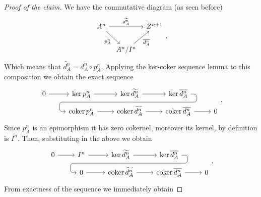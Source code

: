 \documentclass[../Main]{subfiles}
\begin{document}
\begin{proof}[Proof of the claim]
	We have the commutative diagram
	(as seen before)
	\begin{equation}
	\begin{tikzcd}[column sep=tiny]
		A^n \arrow[rr, "\widetilde{d^n_A}", rightarrow] 
		\arrow[rd, "p^n_A"', rightarrow] & &
		Z^{n+1}\\
		&
		A^n/I^n \arrow[ur, "\overline{d^n_A}"', rightarrow] 
	\end{tikzcd}
	.\end{equation} 
	Which means that $\widetilde{d^n_A} = \overline{d^n_A} \circ p^n_A$.
	Applying the ker-coker sequence lemma to this composition we obtain the exact sequence
	\begin{equation}
	\begin{tikzcd}[row sep=tiny]
		0 \arrow[r, "", rightarrow] &
		\ker p^n_A \arrow[r, "", rightarrow] &
		\ker \widetilde{d^n_A} \arrow[r, "", rightarrow] 
		\arrow[d, phantom, ""{coordinate, name=Z}] &
		\ker \overline{d^n_A} 
		\arrow[dll, "", rounded corners, bend left = 100,
		to path={ -- ([xshift=2ex]\tikztostart.east)\tikztonodes
			|- (Z) [near end]
			-| ([xshift=-2ex]\tikztotarget.west)
			-- (\tikztotarget)}] & \\
		& 
		\coker p^n_A \arrow[r, "", rightarrow] &
		\coker \widetilde{d^n_A} \arrow[r, "", rightarrow] &
		\coker \overline{d^n_A} \arrow[r, "", rightarrow] &
		0
	\end{tikzcd}
	.\end{equation} 
	Since $p^n_A$ is an epimorphism it has zero cokernel, moreover its kernel,
	by definition is $I^n$.
	Then, substituting in the above we obtain
	\begin{equation}\label{eqn:exactKerCokerClaim}
	\begin{tikzcd}[row sep=tiny]
		0 \arrow[r, "", rightarrow] &
		I^n \arrow[r, "", rightarrow] &
		\ker \widetilde{d^n_A} \arrow[r, "", rightarrow] 
		\arrow[d, phantom, ""{coordinate, name=Z}] &
		\ker \overline{d^n_A} 
		\arrow[dll, "", rounded corners, bend left = 100,
		to path={ -- ([xshift=2ex]\tikztostart.east)\tikztonodes
			|- (Z) [near end]
			-| ([xshift=-2ex]\tikztotarget.west)
			-- (\tikztotarget)}] & \\
		& 
		0 \arrow[r, "", rightarrow] &
		\coker \widetilde{d^n_A} \arrow[r, "", rightarrow] &
		\coker \overline{d^n_A} \arrow[r, "", rightarrow] &
		0
	\end{tikzcd}
	.\end{equation} 
	From exactness of the sequence we immediately obtain

\end{proof}
\end{document}
